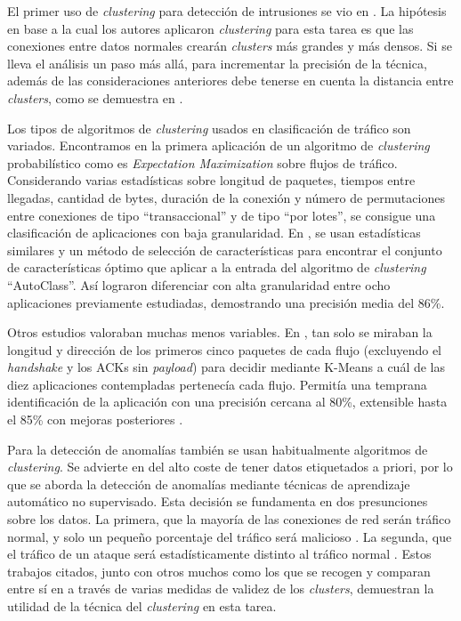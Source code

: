 El primer uso de \emph{clustering} para detección de intrusiones se vio en \cite{Portnoy_2000}.
La hipótesis en base a la cual los autores aplicaron \emph{clustering} para esta tarea es que las conexiones entre datos normales crearán \emph{clusters} más grandes y más densos.
Si se lleva el análisis un paso más allá, para incrementar la precisión de la técnica, además de las consideraciones anteriores
debe tenerse en cuenta la distancia entre \emph{clusters}, como se demuestra en \cite{JSW+06}.

Los tipos de algoritmos de \emph{clustering} usados en clasificación de tráfico son variados.
Encontramos en \cite{MHL+04} la primera aplicación de un algoritmo de \emph{clustering} probabilístico como es \emph{Expectation Maximization} sobre flujos de tráfico.
Considerando varias estadísticas sobre longitud de paquetes, tiempos entre llegadas, cantidad de bytes, duración de la conexión y
número de permutaciones entre conexiones de tipo ``transaccional'' y de tipo ``por lotes'', se consigue una clasificación de aplicaciones con baja granularidad.
En \cite{ZNA05}, se usan estadísticas similares y un método de selección de características para encontrar el conjunto de características óptimo
que aplicar a la entrada del algoritmo de \emph{clustering} ``AutoClass''.
Así lograron diferenciar con alta granularidad entre ocho aplicaciones previamente estudiadas, demostrando una precisión media del 86\%.

Otros estudios valoraban muchas menos variables.
En \cite{BTA+06}, tan solo se miraban la longitud y dirección de los primeros cinco paquetes de cada flujo (excluyendo el \emph{handshake} y los ACKs sin \emph{payload})
para decidir mediante K-Means a cuál de las diez aplicaciones contempladas pertenecía cada flujo.
Permitía una temprana identificación de la aplicación con una precisión cercana al 80\%, extensible hasta el 85\% con mejoras posteriores \cite{BTS06} \cite{BT07}.

Para la detección de anomalías también se usan habitualmente algoritmos de \emph{clustering}.
Se advierte en \cite{Leung_2005} del alto coste de tener datos etiquetados a priori,
por lo que se aborda la detección de anomalías mediante técnicas de aprendizaje automático no supervisado.
Esta decisión se fundamenta en dos presunciones sobre los datos.
La primera, que la mayoría de las conexiones de red serán tráfico normal, y solo un pequeño porcentaje del tráfico será malicioso \cite{Portnoy_2000}.
La segunda, que el tráfico de un ataque será estadísticamente distinto al tráfico normal \cite{Javitz_1993}.
Estos trabajos citados, junto con otros muchos como los que se recogen y comparan entre sí en \cite{Bhuyan_2014} a través de varias medidas de validez de los \emph{clusters},
demuestran la utilidad de la técnica del \emph{clustering} en esta tarea.

